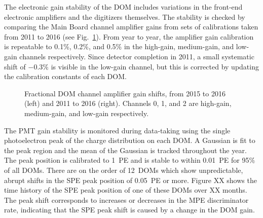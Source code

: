 The electronic gain stability of the DOM includes variations in the
front-end electronic amplifiers and the digitizers themselves.  The
stability is checked by comparing the Main Board channel amplifier gains
from sets of calibrations taken from 2011 to 2016 (see
Fig.~\ref{fig:domcal_ch_gain}).  From year to year, the amplifier gain
calibration is repeatable to 0.1\%, 0.2\%, and 0.5\% in the high-gain,
medium-gain, and low-gain channels respectively.  Since detector completion
in 2011, a small systematic shift of $-0.3\%$ is visible in the low-gain
channel, but this is corrected by updating the calibration constants of
each DOM.

\begin{figure}[!h]
  \captionsetup[subfigure]{labelformat=empty}
  \centering
  \caption{Fractional DOM channel amplifier gain shifts, from 2015 to
    2016 (left) and 2011 to 2016 (right).  Channels 0, 1, and 2 are
    high-gain, medium-gain, and low-gain respectively.}
  \label{fig:domcal_ch_gain}
\end{figure}

The PMT gain stability is monitored during data-taking using the
single photoelectron peak of the charge distribution on each DOM. A
Gaussian is fit to the peak region and the mean of the Gaussian is
tracked throughout the year. The peak position is calibrated to 1~PE
and is stable to within 0.01~PE for 95\% of all DOMs. There are on the
order of 12~DOMs which show unpredictable, abrupt shifts in the SPE peak
position of 0.05~PE or more. Figure XX shows the time history of the
SPE peak position of one of these DOMs over XX months. The peak shift
corresponds to increases or decreases in the MPE discriminator rate,
indicating that the SPE peak shift is caused by a change in the DOM
gain. 


